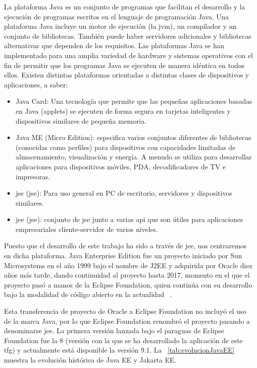 La plataforma Java es un conjunto de programas que facilitan el desarrollo y la ejecución de programas escritos en el lenguaje de programación Java. Una plataforma Java incluye un motor de ejecución (la \acrshort{jvm}), un compilador y un conjunto de bibliotecas. También puede haber servidores adicionales y bibliotecas alternativas que dependen de los requisitos. Las plataformas Java se han implementado para una amplia variedad de hardware y sistemas operativos con el fin de permitir que los programas Java se ejecuten de manera idéntica en todos ellos. Existen distintas plataformas orientadas a distintas clases de dispositivos y aplicaciones, a saber:
\begin{itemize}
\item Java Card: Una tecnología que permite que las pequeñas aplicaciones basadas en Java (applets) se ejecuten de forma segura en tarjetas inteligentes y dispositivos similares de pequeña memoria. 
\item Java ME (Micro Edition): especifica varios conjuntos diferentes de bibliotecas (conocidas como perfiles) para dispositivos con capacidades limitadas de almacenamiento, visualización y energía. A menudo se utiliza para desarrollar aplicaciones para dispositivos móviles, PDA, decodificadores de TV e impresoras. 
\item \acrshort{jse} (\acrlong{jse}): Para uso general en PC de escritorio, servidores y dispositivos similares. 
\item \acrshort{jee} (\acrlong{jee}): conjunto de \acrshort{jse} junto a varias \acrfull{api} que son útiles para aplicaciones empresariales cliente-servidor de varios niveles.
\end{itemize}


Puesto que el desarrollo de este trabajo ha sido a través de \acrshort{jee}, nos centraremos en dicha plataforma. Java Enterprise Edition fue un proyecto iniciado por Sun Microsystems en el año 1999 bajo el nombre de J2EE y adquirida por Oracle diez años más tarde, dando continuidad al proyecto hasta 2017, momento en el que el proyecto pasó a manos de la Eclipse Foundation, quien continúa con su desarrollo bajo la modalidad de código abierto en la actualidad ~\cite{JakartaEE-eclipse}.

Esta transferencia de proyecto de Oracle a Eclipse Foundation no incluyó el uso de la marca Java, por lo que Eclipse Foundation renombró el proyecto pasando a denominarse \acrshort{jee}. La primera versión lanzada bajo el paraguas de Eclipse Foundation fue la 8 (versión con la que se ha desarrollado la aplicación de este \acrshort{tfg}) y actualmente está disponible la versión 9.1. La \tablename~\ref{tab:evolucionJavaEE} muestra la evolución histórica de Java EE y Jakarta EE.

